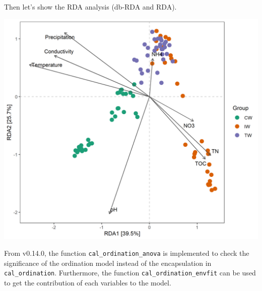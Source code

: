 \documentclass[
]{book}
\newenvironment{Shaded}{\begin{snugshade}}{\end{snugshade}}
\newcommand{\AttributeTok}[1]{\textcolor[rgb]{0.77,0.63,0.00}{#1}}
\newcommand{\CommentTok}[1]{\textcolor[rgb]{0.56,0.35,0.01}{\textit{#1}}}
\newcommand{\ConstantTok}[1]{\textcolor[rgb]{0.00,0.00,0.00}{#1}}
\newcommand{\FloatTok}[1]{\textcolor[rgb]{0.00,0.00,0.81}{#1}}
\newcommand{\FunctionTok}[1]{\textcolor[rgb]{0.00,0.00,0.00}{#1}}
\newcommand{\NormalTok}[1]{#1}
\newcommand{\SpecialCharTok}[1]{\textcolor[rgb]{0.00,0.00,0.00}{#1}}
\newcommand{\StringTok}[1]{\textcolor[rgb]{0.31,0.60,0.02}{#1}}
\begin{document}
Then let's show the RDA analysis (db-RDA and RDA).

\begin{Shaded}
\end{Shaded}

\begin{center}\includegraphics[width=650px]{Images/plot_rda_dbrda} \end{center}

From v0.14.0, the function \texttt{cal\_ordination\_anova} is implemented to check the significance of the ordination model instead of the encapsulation in \texttt{cal\_ordination}.
Furthermore, the function \texttt{cal\_ordination\_envfit} can be used to get the contribution of each variables to the model.
\end{document}
